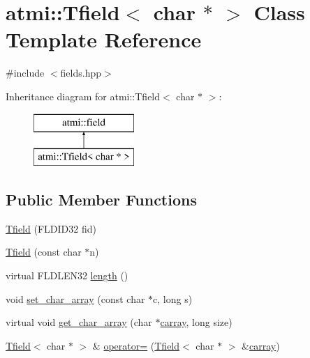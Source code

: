 \hypertarget{classatmi_1_1_tfield_3_01char_01_5_01_4}{\section{atmi\+:\+:Tfield$<$ char $\ast$ $>$ Class Template Reference}
\label{classatmi_1_1_tfield_3_01char_01_5_01_4}
}


 




{\ttfamily \#include $<$fields.\+hpp$>$}

Inheritance diagram for atmi\+:\+:Tfield$<$ char $\ast$ $>$\+:\begin{figure}[H]
\begin{center}
\leavevmode
\includegraphics[height=2.000000cm]{classatmi_1_1_tfield_3_01char_01_5_01_4}
\end{center}
\end{figure}
\subsection*{Public Member Functions}
\begin{DoxyCompactItemize}
\item 
\hyperlink{classatmi_1_1_tfield_3_01char_01_5_01_4_ad16891d15a65e85408962ec962e57bd8}{Tfield} (F\+L\+D\+I\+D32 fid)
\item 
\hyperlink{classatmi_1_1_tfield_3_01char_01_5_01_4_a197bf4f86d8053adcf8afdcd839b85cc}{Tfield} (const char $\ast$n)
\item 
virtual F\+L\+D\+L\+E\+N32 \hyperlink{classatmi_1_1_tfield_3_01char_01_5_01_4_aa97dec8559724186b62997409f04bf3f}{length} ()
\item 
void \hyperlink{classatmi_1_1_tfield_3_01char_01_5_01_4_a57def5d907b0f5671a5dae41bccd64f1}{set\+\_\+char\+\_\+array} (const char $\ast$c, long s)
\item 
virtual void \hyperlink{classatmi_1_1_tfield_3_01char_01_5_01_4_a9ba99e63bbc32091f3a0614b2fe186fe}{get\+\_\+char\+\_\+array} (char $\ast$\hyperlink{group__fml_ga8b57f9a4e2453d8e5d82ac0016e35e87}{carray}, long size)
\item 
\hyperlink{classatmi_1_1_tfield}{Tfield}$<$ char $\ast$ $>$ \& \hyperlink{classatmi_1_1_tfield_3_01char_01_5_01_4_a486559e383ca6ae8002cb527901b716f}{operator=} (\hyperlink{classatmi_1_1_tfield}{Tfield}$<$ char $\ast$ $>$ \&\hyperlink{group__fml_ga8b57f9a4e2453d8e5d82ac0016e35e87}{carray})
\end{DoxyCompactItemize}
